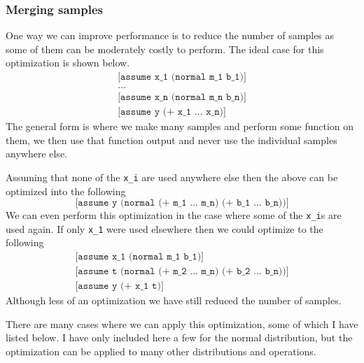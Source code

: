 \documentclass[a4paper]{article}
\begin{document}

\subsubsection{Merging samples}

One way we can improve performance is to reduce the number of samples as some of them can be moderately costly to perform. The ideal case for this optimization is shown below.
\[
	\begin{array}{l}
		\texttt{[assume x\_1 (normal m\_1 b\_1)]} \\
		\texttt{...} \\
		\texttt{[assume x\_n (normal m\_n b\_n)]} \\
		\texttt{[assume y (+ x\_1 ...\ x\_n)]}
	\end{array}
\]
The general form is where we make many samples and perform some function on them, we then use that function output and never use the individual samples anywhere else.

Assuming that none of the \texttt{x\_i} are used anywhere else then the above can be optimized into the following
\[
	\texttt{[assume y (normal (+ m\_1 ...\ m\_n) (+ b\_1 ...\ b\_n))]}
\]
We can even perform this optimization in the case where some of the \texttt{x\_i}s are used again. If only \texttt{x\_1} were used elsewhere then we could optimize to the following
\[
	\begin{array}{l}
		\texttt{[assume x\_1 (normal m\_1 b\_1)]} \\
		\texttt{[assume t (normal (+ m\_2 ...\ m\_n) (+ b\_2 ...\ b\_n))]} \\
		\texttt{[assume y (+ x\_1 t)]}
	\end{array}
\]
Although less of an optimization we have still reduced the number of samples.

There are many cases where we can apply this optimization, some of which I have listed below. I have only included here a few for the normal distribution, but the optimization can be applied to many other distributions and operations.
\end{document}
